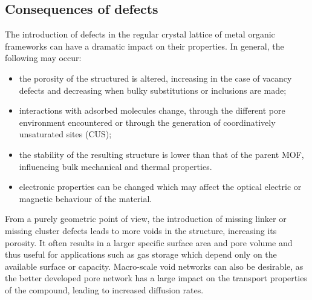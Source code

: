 
\subsection{Consequences of defects}

The introduction of defects in the regular crystal lattice of metal
organic frameworks can have a dramatic impact on their properties.
In general, the following may occur:

\begin{itemize}
	\item the porosity of the structured is altered, increasing
	      in the case of vacancy defects and decreasing when bulky
	      substitutions or inclusions are made;
	\item interactions with adsorbed molecules change,
	      through the different pore environment encountered or
	      through the generation of coordinatively unsaturated
	      sites (CUS);
	\item the stability of the resulting structure is lower
	      than that of the parent MOF, influencing bulk mechanical
	      and thermal properties.
	\item electronic properties can be changed which may
	      affect the optical electric or magnetic behaviour of the
	      material.
\end{itemize}

From a purely geometric point of view, the introduction of missing
linker or missing cluster defects leads to more voids in the structure,
increasing its porosity. It often results in a larger
specific surface area and pore volume and thus useful for applications
such as gas storage which depend only on the available surface or
capacity. Macro-scale void networks can also be desirable, as the 
better developed pore network has a large impact on the transport
properties of the compound, leading to increased diffusion rates. 


